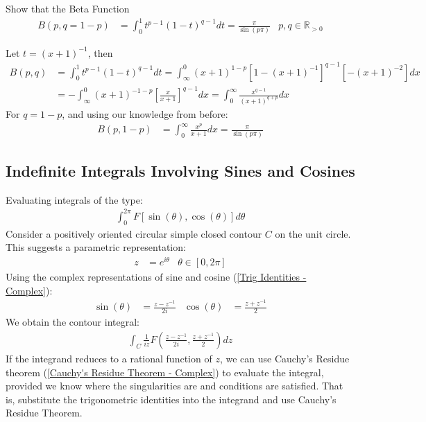 \documentclass[12pt, english]{book}
\makeatletter
\renewenvironment{proof}[1][\proofname]{\par
	\pushQED{\qed}%
	\normalfont \topsep6\p@\@plus6\p@\relax
	\list{}{%
		\settowidth{\leftmargin}{\itshape\proofname:\hskip\labelsep}%
		\setlength{\labelwidth}{0pt}%
		\setlength{\itemindent}{-\leftmargin}%
		}%
	\item[\hskip\labelsep\itshape#1\@addpunct{:}]\ignorespaces
	}{\popQED\endlist\@endpefalse}
\makeatother
\begin{document}
	\begin{example}
		\label{Beta Function Example - Complex}
		Show that the Beta Function
		\begin{align*}
			B(p,q=1-p) 
			&= \int_{0}^{1} t^{p-1} (1-t)^{q-1} dt = \frac{\pi}{\sin(p\pi)}
				& p,q \in \mathbb{R}_{>0}
		\end{align*}
		\begin{proof}
			{\color{Grey}
			Let \(t = (x+1)^{-1}\), then
			\begin{align*}
				B(p, q) 
				&= \int_{0}^{1} t^{p-1} (1-t)^{q-1} dt 
				 = \int_{\infty}^{0} (x+1)^{1-p} [1- (x+1)^{-1}]^{q-1} [-(x+1)^{-2}] dx  \\
				&= - \int_{\infty}^{0} (x+1)^{-1-p} \left[\frac{x}{x+1}\right]^{q-1} dx
				 = \int_{0}^{\infty} \frac{x^{q-1}}{(x+1)^{q+p}} dx
			\end{align*}
			For \(q = 1-p\), and using our knowledge from before:
			\begin{align*}
				B(p, 1-p) &= \int_{0}^{\infty} \frac{x^{p}}{x+1} dx = \frac{\pi}{\sin(p\pi)}
			\end{align*}
			}
		\end{proof}
	\end{example}
	
	\subsection{Indefinite Integrals Involving Sines and Cosines} \label{Indefinite Integrals Involving Sines and Cosines Subsection - Complex}
	
	Evaluating integrals of the type:
	\begin{align*}
		\int_{0}^{2\pi} F[\sin(\theta), \cos(\theta)] d\theta
	\end{align*}
	Consider a positively oriented circular simple closed contour \(C\) on the unit circle. This suggests a parametric representation:
	\begin{align*}
		z &= e^{i\theta}	& \theta \in [0, 2\pi]
	\end{align*}
	Using the complex representations of sine and cosine (\cref{Trig Identities - Complex}):
	\begin{align*}
		\sin(\theta) &= \frac{z - z^{-1}}{2i} &
		\cos(\theta) &= \frac{z + z^{-1}}{2}
	\end{align*}
	We obtain the contour integral:
	\begin{align*}
		\int_{C} \frac{1}{iz} F\left( \frac{z-z^{-1}}{2i}, \frac{z+z^{-1}}{2}\right) dz
	\end{align*}
	If the integrand reduces to a rational function of \(z\), we can use Cauchy's Residue theorem (\cref{Cauchy's Residue Theorem - Complex}) to evaluate the integral, provided we know where the singularities are and conditions are satisfied. That is, substitute the trigonometric identities into the integrand and use Cauchy's Residue Theorem.
	
\end{document}
